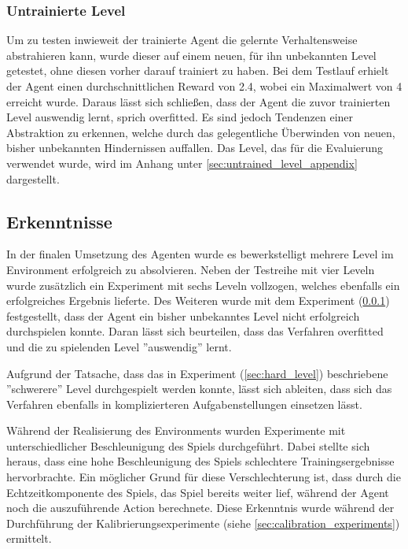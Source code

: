 \documentclass[11pt]{scrartcl}
\begin{document}
\subsubsection{Untrainierte Level}
\label{sec:untrained_level}
Um zu testen inwieweit der trainierte Agent die gelernte Verhaltensweise abstrahieren
kann, wurde dieser auf einem neuen, für ihn unbekannten Level getestet, ohne diesen
vorher darauf trainiert zu haben. Bei dem Testlauf erhielt der Agent einen durchschnittlichen
Reward von 2.4, wobei ein Maximalwert von 4 erreicht wurde. Daraus lässt sich schließen,
dass der Agent die zuvor trainierten Level auswendig lernt, sprich overfitted. Es sind
jedoch Tendenzen einer Abstraktion zu erkennen, welche durch das gelegentliche Überwinden
von neuen, bisher unbekannten Hindernissen auffallen. Das Level, das für die Evaluierung verwendet wurde, wird
im Anhang unter \ref{sec:untrained_level_appendix} dargestellt.

\newpage
\subsection{Erkenntnisse}
\label{sec:results}
In der finalen Umsetzung des Agenten wurde es bewerkstelligt mehrere Level im Environment
erfolgreich zu absolvieren. Neben der Testreihe mit vier Leveln wurde zusätzlich ein
Experiment mit sechs Leveln vollzogen, welches ebenfalls ein erfolgreiches Ergebnis
lieferte. Des Weiteren wurde mit dem Experiment (\ref{sec:untrained_level}) festgestellt,
dass der Agent ein bisher unbekanntes Level nicht erfolgreich durchspielen konnte. Daran
lässt sich beurteilen, dass das Verfahren overfitted und die zu spielenden Level ''auswendig''
lernt.

Aufgrund der Tatsache, dass das in Experiment (\ref{sec:hard_level})
beschriebene ''schwerere'' Level durchgespielt werden konnte, lässt sich ableiten, dass sich
das Verfahren ebenfalls in komplizierteren Aufgabenstellungen einsetzen lässt. %

Während der Realisierung des Environments wurden Experimente mit unterschiedlicher Beschleunigung
des Spiels durchgeführt. Dabei stellte sich heraus, dass eine hohe Beschleunigung des Spiels
schlechtere Trainingsergebnisse hervorbrachte. Ein möglicher Grund für diese Verschlechterung ist,
dass durch die Echtzeitkomponente des Spiels, das Spiel bereits weiter lief, während der Agent noch
die auszuführende Action berechnete. Diese Erkenntnis wurde während der Durchführung der
Kalibrierungsexperimente (siehe \ref{sec:calibration_experiments}) ermittelt.
\end{document}
